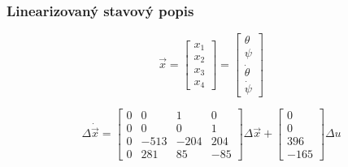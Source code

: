 \documentclass{beamer}
\begin{document}
    \begin{frame}
        \frametitle{Linearizovaný stavový popis}

        \begin{equation}
            \vec{x} = \begin{bmatrix}
                x_1 \\
                x_2 \\
                x_3 \\
                x_4
            \end{bmatrix} = \begin{bmatrix}
                \theta \\
                \psi \\
                \dot{\theta} \\
                \dot{\psi}
            \end{bmatrix}
        \end{equation}

        \begin{equation}
            \Delta \dot{\vec{x}} = \begin{bmatrix}
                0 &        0 &    1 &        0 \\
                0 &        0 &         0 &   1 \\
                0 &-513 & -204 & 204 \\
                0 & 281 &   85 & -85
            \end{bmatrix} \Delta \vec{x} + \begin{bmatrix}
                0 \\ 0 \\   396 \\-165
            \end{bmatrix} \Delta u
        \end{equation}  

    \end{frame}
\end{document}
